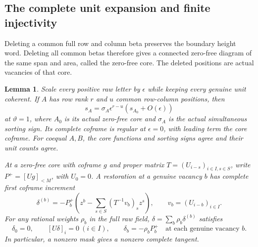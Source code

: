 \documentclass[11pt,a4paper]{amsart}
\numberwithin{equation}{section}
\theoremstyle{plain}
\newtheorem{lemma}[theorem]{Lemma}
\theoremstyle{definition}
\begin{document}
\subsection{The complete unit expansion and finite injectivity}

Deleting a common full row and column beta preserves the boundary
height word.  Deleting all common betas therefore gives a connected
zero-free diagram of the same span and area, called the zero-free
core.  The deleted positions are actual vacancies of that core.

\begin{lemma}\label{sc:unit-expansion}
Scale every positive raw letter by \(\epsilon\) while keeping every
genuine unit coherent.  If \(A\) has row rank \(r\) and \(u\) common
row-column positions, then
\begin{equation}\label{sc:core-leading-term}
 s_A=\sigma_A\epsilon^{r-u}
            (s_{A_0}+O(\epsilon))
\end{equation}
at \(\vartheta=1\), where \(A_0\) is its actual zero-free core and \(\sigma_A\)
is the actual simultaneous sorting sign.  Its complete coframe is
regular at \(\epsilon=0\), with leading term the core coframe.
For coequal \(A,B\), the core functions and sorting signs agree and
their unit counts agree.

At a zero-free core with coframe \(g\) and proper matrix
\(T=(U_{i-s})_{i\in I,s\in S}\), write
\(P^+=[Ug]_{<M}\), with \(U_0=0\).  A restoration at a genuine vacancy
\(b\) has complete first coframe increment
\begin{equation}\label{sc:vacancy-pulse}
 \delta^{(b)}=-P^+_b\left(
 z^b-\sum_{s\in S}(T^{-1}v_b)_s z^s\right),
 \qquad v_b=(U_{i-b})_{i\in I}.
\end{equation}
For any rational weights \(\rho_b\) in the full raw field,
\(\delta=\sum_b\rho_b\delta^{(b)}\) satisfies
\[
 \delta_0=0,\qquad [U\delta]_i=0\ (i\in I),\qquad
 \delta_b=-\rho_bP^+_b
 \quad\text{at each genuine vacancy }b.
\]
In particular, a nonzero mask gives a nonzero complete tangent.
\end{lemma}
\end{document}
